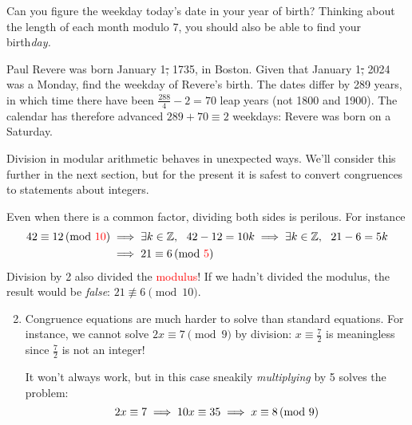 Can you figure the weekday today's date in your year of birth? Thinking about the length of each month modulo 7, you should also be able to find your birth\emph{day.}

\begin{example}{}{}
	Paul Revere was born January 1\st, 1735, in Boston. Given that January 1\st, 2024 was a Monday, find the weekday of Revere's birth.\smallbreak
	The dates differ by 289 years, in which time there have been $\frac{288}4-2=70$ leap years (not 1800 and 1900). The calendar has therefore advanced $289+70\equiv 2$ weekdays: Revere was born on a Saturday.
\end{example}



Division in modular arithmetic behaves in unexpected ways. We'll consider this further in the next section, but for the present it is safest to convert congruences to statements about integers.

\begin{examples}{}{}
	\exstart Even when there is a common factor, dividing both sides is perilous. For instance
	\begin{align*}
		42\equiv 12\negthickspace\pmod{\textcolor{red}{10}}&\implies \exists k\in\mathbb{Z},\ \ 42-12=10k \implies \exists k\in\mathbb{Z},\ \ 21-6=5k\\
		&\implies 21\equiv 6\negthickspace\pmod{\textcolor{red}{5}}
	\end{align*}
	Division by 2 also divided the \textcolor{red}{modulus}! If we hadn't divided the modulus, the result would be \emph{false}: $21\not\equiv 6\pmod{10}$.
	
		
		\begin{enumerate}\setcounter{enumi}{1}
		  \item Congruence equations are much harder to solve than standard equations. For instance, we cannot solve $2x\equiv 7\pmod 9$ by division: $x\equiv \frac 72$ is meaningless since $\frac 72$ is not an integer!\par 			It won't always work, but in this case sneakily \emph{multiplying} by 5 solves the problem:
			\[
				2x\equiv 7\implies 10x\equiv 35\implies x\equiv 8\negthickspace\pmod{9}
			\]
\end{enumerate}
\end{examples}

